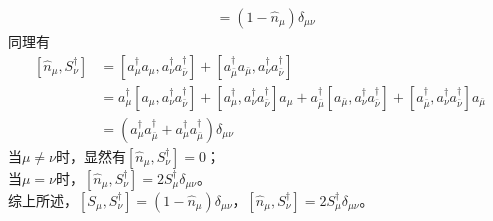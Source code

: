 \documentclass[12pt]{article}
\numberwithin{equation}{section}	 %
\begin{document}
\begin{spacing}{1.5}
\begin{align*}
&= \left(1 - \hat{n}_{\mu}\right)\delta_{\mu\nu}
\end{align*}
同理有
\begin{align*}
\left[\hat{n}_{\mu},S_{\nu}^{\dag}\right] &= \left[a_{\mu}^{\dag}a_{\mu} , a_{\nu}^{\dag}a_{\bar\nu}^{\dag}\right] + \left[a_{\bar\mu}^{\dag}a_{\bar\mu} , a_{\nu}^{\dag}a_{\bar\nu}^{\dag}\right] \\
&= a_{\mu}^{\dag}\left[a_{\mu} , a_{\nu}^{\dag}a_{\bar\nu}^{\dag}\right] + \left[a_{\mu}^{\dag} , a_{\nu}^{\dag}a_{\bar\nu}^{\dag}\right]a_{\mu} + a_{\bar\mu}^{\dag}\left[a_{\bar\mu} , a_{\nu}^{\dag}a_{\bar\nu}^{\dag}\right] + \left[a_{\bar\mu}^{\dag} , a_{\nu}^{\dag}a_{\bar\nu}^{\dag}\right]a_{\bar\mu} \\
&= \left(a_{\mu}^{\dag}a_{\bar\mu}^{\dag} + a_{\mu}^{\dag}a_{\bar\mu}^{\dag}\right)\delta_{\mu\nu}
\end{align*}
当$\mu \ne \nu$时，显然有$\displaystyle \left[\hat{n}_{\mu},S_{\nu}^{\dag}\right] = 0$；\\
当$\mu = \nu$时，$\displaystyle \left[\hat{n}_{\mu},S_{\nu}^{\dag}\right] = 2S_{\mu}^{\dag}\delta_{\mu\nu}$。\\
综上所述，$\displaystyle \left[S_{\mu},S_{\nu}^{\dag}\right]=\left(1-\hat{n}_{\mu}\right)\delta_{\mu\nu}$，$\displaystyle \left[\hat{n}_{\mu},S_{\nu}^{\dag}\right]=2S_{\mu}^{\dag}\delta_{\mu\nu}$。\\
~\\
~\\



\end{spacing}
\end{document}
